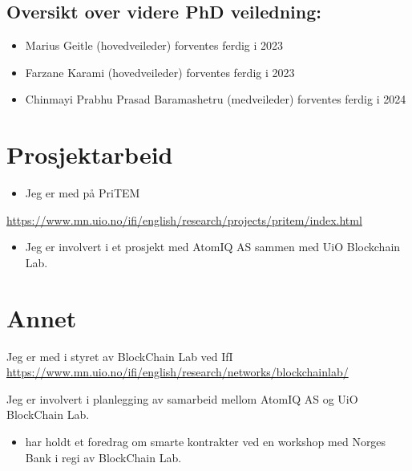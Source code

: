 \documentclass[11pt]{article}
\begin{document}
\subsection{Oversikt over videre PhD veiledning:}
\label{sec-1-8}

\begin{itemize}
\item Marius Geitle  (hovedveileder) forventes ferdig i 2023
\item Farzane Karami  (hovedveileder) forventes ferdig i 2023
\item Chinmayi Prabhu Prasad Baramashetru  (medveileder) forventes ferdig
i 2024
\end{itemize}

\section{Prosjektarbeid}
\label{sec-2}
\begin{itemize}
\item Jeg er med på PriTEM
\end{itemize}
\url{https://www.mn.uio.no/ifi/english/research/projects/pritem/index.html}

\begin{itemize}
\item Jeg er involvert i et prosjekt med AtomIQ AS sammen med UiO Blockchain Lab.
\end{itemize}

\section{Annet}
\label{sec-3}
Jeg er med i styret av BlockChain Lab ved IfI
\url{https://www.mn.uio.no/ifi/english/research/networks/blockchainlab/}

Jeg er involvert i planlegging av  samarbeid mellom AtomIQ AS og  UiO
BlockChain Lab.

\begin{itemize}
\item har  holdt et  foredrag om smarte kontrakter
ved en workshop med Norges Bank i regi av BlockChain Lab.
\end{itemize}
\end{document}
